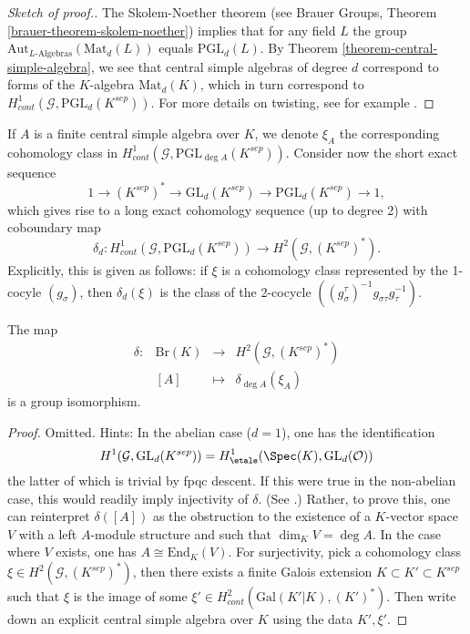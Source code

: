 \begin{proof}[Sketch of proof.]
The Skolem-Noether theorem (see
Brauer Groups, Theorem \ref{brauer-theorem-skolem-noether})
implies that for any field $L$ the group
$\text{Aut}_{L\text{-Algebras}}(\text{Mat}_d(L))$
equals $\text{PGL}_d(L)$. By
Theorem \ref{theorem-central-simple-algebra}, we see that
central simple algebras of degree $d$ correspond
to forms of the $K$-algebra $\text{Mat}_d(K)$, which in turn correspond to
$H_{cont}^1 (\mathcal{G}, \text{PGL}_d(K^{sep}))$. For more details on
twisting, see for example
\cite{SilvermanEllipticCurves}.
\end{proof}

\noindent
If $A$ is a finite central simple algebra over $K$, we denote $\xi_A$ the
corresponding cohomology class in $H_{cont}^1 (\mathcal{G}, \text{PGL}_{\deg
A}(K^{sep}))$. Consider now the short exact sequence
$$
1 \to (K^{sep})^* \to \text{GL}_d(K^{sep}) \to \text{PGL}_d(K^{sep}) \to 1,
$$
which gives rise to a long exact cohomology sequence (up to degree 2) with
coboundary map
$$
\delta_d : H_{cont} ^1(\mathcal{G}, \text{PGL}_d(K^{sep})) \to H^2
(\mathcal{G}, (K^{sep})^*).
$$
Explicitly, this is given as follows: if $\xi$ is a cohomology class
represented by the 1-cocyle $(g_\sigma)$, then $\delta_d(\xi)$ is the class of
the 2-cocycle $((g_\sigma^\tau)^{-1} g_{\sigma \tau} g_\tau^{-1})$.

\begin{theorem}
\label{theorem-brauer-delta}
The map
$$
\begin{matrix}
\delta : & \text{Br}(K) & \longrightarrow & H^2(\mathcal{G}, (K^{sep})^*) \\
& [A] & \longmapsto & \delta_{\deg A} (\xi_A)
\end{matrix}
$$
is a group isomorphism.
\end{theorem}

\begin{proof}
Omitted. Hints: In the abelian case ($d = 1$), one has the identification
$$
H^1 (\mathcal{G}, \text{GL}_d(K^{sep})) =
H_\etale^1(\Spec(K), \text{GL}_d(\mathcal{O}))
$$
the latter of which is trivial by fpqc descent. If this were true in the
non-abelian case, this would readily imply injectivity of $\delta$. (See
\cite{SGA4.5}.) Rather, to prove this, one can reinterpret $\delta([A])$ as the
obstruction to the existence of a $K$-vector space $V$ with a left $A$-module
structure and such that $\dim_K V = \deg A$. In the case where $V$ exists, one
has $A \cong \text{End}_K(V)$. For surjectivity, pick a
cohomology class $\xi \in H^2(\mathcal{G}, (K^{sep})^*)$, then there exists a
finite Galois extension $K \subset K' \subset K^{sep}$ such that $\xi$ is
the image of some $\xi' \in H_{cont}^2(\text{Gal}(K'|K), (K')^*)$. Then write
down an explicit central simple algebra over $K$ using the data $K', \xi'$.
\end{proof}

